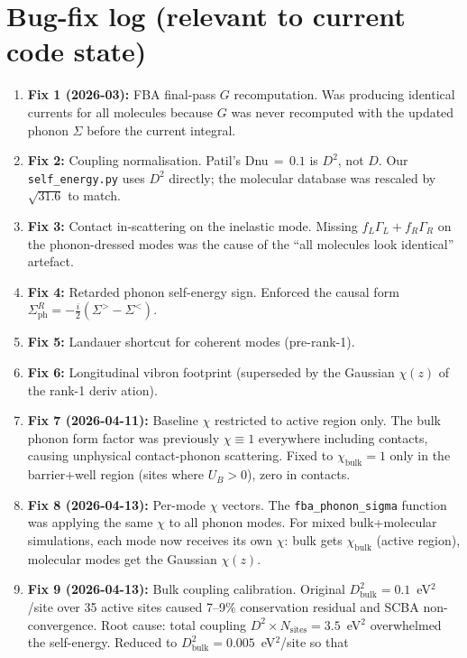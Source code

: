 \documentclass[11pt,a4paper,onecolumn]{article}
\newcommand{\code}[1]{\texttt{\small #1}}
\begin{document}
\section{Bug-fix log (relevant to current code state)}
\begin{enumerate}[leftmargin=1.3em,itemsep=0pt]
\item \textbf{Fix 1 (2026-03):} FBA final-pass $G$ recomputation. Was
producing identical currents for all molecules because $G$ was never
recomputed with the updated phonon $\Sigma$ before the current integral.
\item \textbf{Fix 2:} Coupling normalisation. Patil's Dnu\,$=\,0.1$ is
$D^2$, not $D$. Our \code{self\_energy.py} uses $D^2$ directly; the
molecular database was rescaled by $\sqrt{31.6}$ to match.
\item \textbf{Fix 3:} Contact in-scattering on the inelastic mode.
Missing $f_L\Gamma_L + f_R\Gamma_R$ on the phonon-dressed modes was the
cause of the ``all molecules look identical'' artefact.
\item \textbf{Fix 4:} Retarded phonon self-energy sign. Enforced the
causal form $\Sigma^R_{\mathrm{ph}} = -\tfrac{i}{2}(\Sigma^> - \Sigma^<)$.
\item \textbf{Fix 5:} Landauer shortcut for coherent modes (pre-rank-1).
\item \textbf{Fix 6:} Longitudinal vibron footprint (superseded by the
Gaussian $\chi(z)$ of the rank-1 deriv
ation).
\item \textbf{Fix 7 (2026-04-11):} Baseline $\chi$ restricted to active region only.
The bulk phonon form factor was previously $\chi \equiv 1$ everywhere including contacts,
causing unphysical contact-phonon scattering. Fixed to $\chi_{\mathrm{bulk}} = 1$
only in the barrier+well region (sites where $U_B > 0$), zero in contacts.
\item \textbf{Fix 8 (2026-04-13):} Per-mode $\chi$ vectors. The
\code{fba\_phonon\_sigma} function was applying the same $\chi$ to all phonon
modes. For mixed bulk+molecular simulations, each mode now receives its own
$\chi$: bulk gets $\chi_{\mathrm{bulk}}$ (active region), molecular modes
get the Gaussian $\chi(z)$.
\item \textbf{Fix 9 (2026-04-13):} Bulk coupling calibration. Original
$D^2_{\mathrm{bulk}} = 0.1$~eV$^2$/site over 35 active sites caused 7--9\%
conservation residual and SCBA non-convergence. Root cause: total coupling
$D^2 \times N_{\mathrm{sites}} = 3.5$~eV$^2$ overwhelmed the self-energy.
Reduced to $D^2_{\mathrm{bulk}} = 0.005$~eV$^2$/site so that

\end{enumerate}
\end{document}
